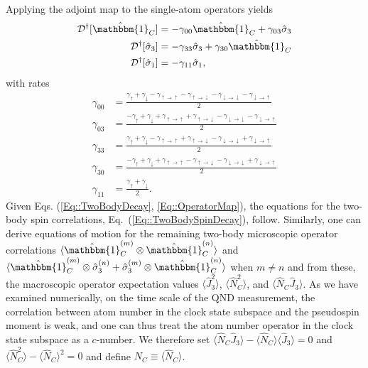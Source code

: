 \documentclass[preprint, aps,pra,onecolumn]{revtex4-1} %
\newcommand{\erf}[1]{Eq.~(\ref{#1})}
\newcommand{\expt}[1]{\langle{#1}\rangle}
\newcommand{\dg}{^\dagger}
\newcommand{\gammauu}{\gamma_{\uparrow \rightarrow \uparrow}}
\newcommand{\gammadd}{\gamma_{\downarrow \rightarrow \downarrow}}
\newcommand{\gammaud}{\gamma_{\uparrow \rightarrow \downarrow}}
\newcommand{\gammadu}{\gamma_{\downarrow \rightarrow \uparrow}}
\begin{document}
\begin{appendix}
Applying the adjoint map to the single-atom operators yields 
	\begin{subequations} \label{Eq::OperatorMap}
	\begin{align}
		\mathcal{D}\dg[\hat{\mathbbm{1}}_C] & = - \gamma_{00} \hat{\mathbbm{1}}_C +\gamma_{03} \hat{\sigma}_3 \label {Eq::Idecay} \\
		\mathcal{D}\dg[\hat{\sigma}_3] & =- \gamma_{33} \hat{\sigma}_3 +  \gamma_{30} \hat{\mathbbm{1}}_C 
\label{Eq::zdecay} \\
		\mathcal{D}\dg[\hat{\sigma}_1] & = - \gamma_{11} \hat{\sigma}_1\label{Eq::xdecay},
	\end{align}
	\end{subequations}
with rates	
	\begin{subequations} \label{Eq::DecayRates}
	\begin{align}
		\gamma_{00} 
			& = \frac{\gamma_{\uparrow}+\gamma_{\downarrow} - \gammauu-\gammaud  -\gammadd-\gammadu}{2} \label{Eq::lrate} \\
			\gamma_{03} 
			& = \frac{-\gamma_{\uparrow}+\gamma_{\downarrow} +\gammauu + \gammaud - \gammadd - \gammadu }{2}\\		
		\gamma_{33} 
			& = \frac{\gamma_{\uparrow}+\gamma_{\downarrow} - \gammauu+\gammaud  -\gammadd+\gammadu}{2}\\
			\gamma_{30} 
			& = \frac{-\gamma_{\uparrow} + \gamma_{\downarrow} + \gammauu - \gammaud - \gammadd + \gammadu }{2} \\
			\gamma_{11} 
			& = \frac{\gamma_{\uparrow}+\gamma_{\downarrow}}{2}. \label{Eq::frate}
	\end{align}
	\end{subequations}
Given Eqs. (\ref{Eq::TwoBodyDecay}, \ref{Eq::OperatorMap}), the equations for the two-body spin correlations, \erf{Eq::TwoBodySpinDecay}, follow.  Similarly, one can derive equations of motion for the remaining two-body microscopic operator correlations $ \expt{\hat{\mathbbm{1}}^{(m)}_C \otimes \hat{\mathbbm{1}}^{(n)}_C} $ and $ \expt{\hat{\mathbbm{1}}^{(m)}_C \otimes \hat{\sigma}_3^{(n)} + \hat{\sigma}_3^{(m)} \otimes \hat{\mathbbm{1}}^{(n)}_C } $ when $ m\neq n $ and from these, the macroscopic operator expectation values $ \expt{\hat{J}_3^2} $, $ \expt{\hat{N}_C^2} $, and $ \expt{\hat{N}_C\hat{J}_3} $.  As we have examined numerically, on the time scale of the QND measurement, the correlation between atom number in the clock state subspace and the pseudospin moment is weak, and one can thus treat the atom number operator in the clock state subspace as a $c$-number.
We therefore set $ \expt{\hat{N}_C\hat{J}_3}-\expt{\hat{N}_C}\expt{\hat{J}_3} = 0 $ and $ \expt{\hat{N}_C^2} - \expt{\hat{N}_C}^2 = 0 $ and define $ N_C\equiv \expt{\hat{N}_C}$. 


\end{appendix}
\end{document}
